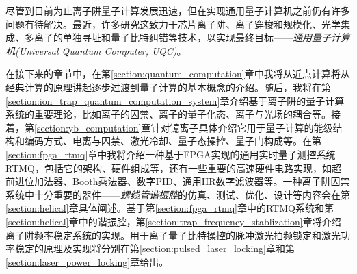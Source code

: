 尽管到目前为止离子阱量子计算发展迅速，但在实现通用量子计算机之前仍有许多问题有待解决。最近，许多研究这致力于芯片离子阱\cite[]{Mehta_Eltony_Bruzewicz_Chuang_Ram_Sage_Chiaverini_2014}、离子穿梭和规模化\cite[]{Monroe_Kim_2013, Sterling_Rattanasonti_Weidt_Lake_Srinivasan_Webster_Kraft_Hensinger_2014, Lee_Jeong_Park_Jung_Kim_Cho_2021}、光学集成\cite[]{Niffenegger_Stuart_Sorace_Agaskar_Kharas_Bramhavar_Bruzewicz_Loh_Maxson_McConnell_Reens_et_al_2020, Mehta_Zhang_Malinowski_Nguyen_Stadler_Home_2020}、多离子的单独寻址\cite[]{Ivory_Setzer_Karl_McGuinness_DeRose_Blain_Stick_Gehl_Parazzoli_2020}和量子比特纠错\cite[]{Cramer_Kalb_Rol_Hensen_Blok_Markham_Twitchen_Hanson_Taminiau_2016,Reichardt_2021}等技术，以实现最终目标——\emph{通用量子计算机(Universal Quantum Computer, UQC)}。

在接下来的章节中，在第\ref{section:quantum_computation}章中我将从近点计算将从经典计算的原理讲起逐步过渡到量子计算的基本概念的介绍。随后，我将在第\ref{section:ion_trap_quantum_computation_system}章介绍基于离子阱的量子计算系统的重要理论，比如离子的囚禁、离子的量子化态、离子与光场的耦合等。接着，第\ref{section:yb_computation}章针对镱离子具体介绍它用于量子计算的能级结构和编码方式、电离与囚禁、激光冷却、量子态操控、量子门构成等。在第\ref{section:fpga_rtmq}章中我将介绍一种基于FPGA实现的通用实时量子测控系统RTMQ，包括它的架构、硬件组成等，还有一些重要的高速硬件电路实现，如超前进位加法器、Booth乘法器、数字PID、通用IIR数字滤波器等。一种离子阱囚禁系统中十分重要的器件——\emph{螺线管谐振腔}的仿真、测试、优化、设计等内容会在第\ref{section:helical}章具体阐述。基于第\ref{section:fpga_rtmq}章中的RTMQ系统和第\ref{section:helical}章中的谐振腔，第\ref{section:trap_frequency_stablization}章将介绍离子阱频率稳定系统的实现。用于离子量子比特操控的脉冲激光拍频锁定和激光功率稳定的原理及实现将分别在第\ref{section:pulsed_laser_locking}章和第\ref{section:laser_power_locking}章给出。